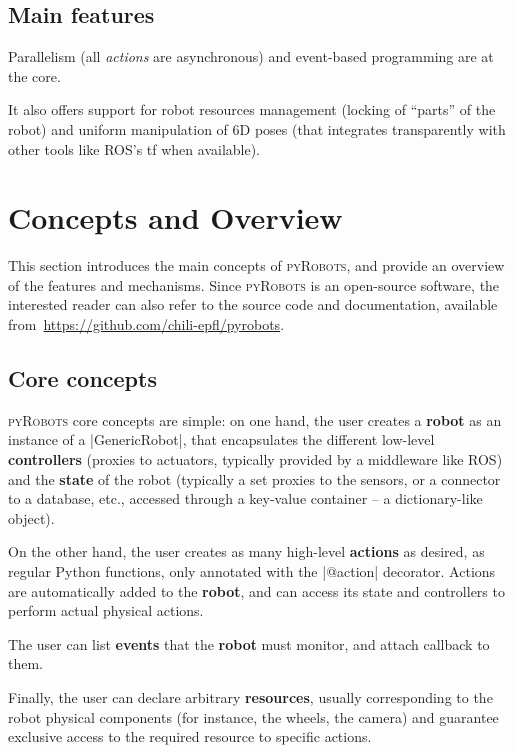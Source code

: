 \documentclass[a4paper, 10pt, conference]{ieeeconf}      %
\newcommand{\pyRobots}{\textsc{pyRobots}}
\begin{document}
\subsection{Main features}

Parallelism (all \emph{actions} are asynchronous) and event-based programming
are at the core.

It also offers support for robot resources management (locking of ``parts'' of
the robot) and uniform manipulation of 6D poses (that integrates transparently
with other tools like ROS's {\sc tf} when available).

\section{Concepts and Overview}

This section introduces the main concepts of \pyRobots{},
and provide an overview of the features and mechanisms. Since \pyRobots{} is an
open-source software, the interested reader can also refer to the source code
and documentation, available from~\url{https://github.com/chili-epfl/pyrobots}.

\subsection{Core concepts}

\pyRobots{} core concepts are simple: on one hand, the user creates a
\textbf{robot} as an instance of a \python|GenericRobot|, that encapsulates the
different low-level \textbf{controllers} (proxies to actuators, typically
provided by a middleware like ROS) and the \textbf{state} of the robot
(typically a set proxies to the sensors, or a connector to a database, etc.,
accessed through a key-value container -- a dictionary-like object).

On the other hand, the user creates as many high-level \textbf{actions} as
desired, as regular Python functions, only annotated with the \python|@action|
decorator. Actions are automatically added to the \textbf{robot}, and can access
its state and controllers to perform actual physical actions.

The user can list \textbf{events} that the \textbf{robot} must monitor, and
attach callback to them.

Finally, the user can declare arbitrary \textbf{resources}, usually
corresponding to the robot physical components (for instance, the wheels, the
camera) and guarantee exclusive access to the required resource to specific
actions.
\end{document}
